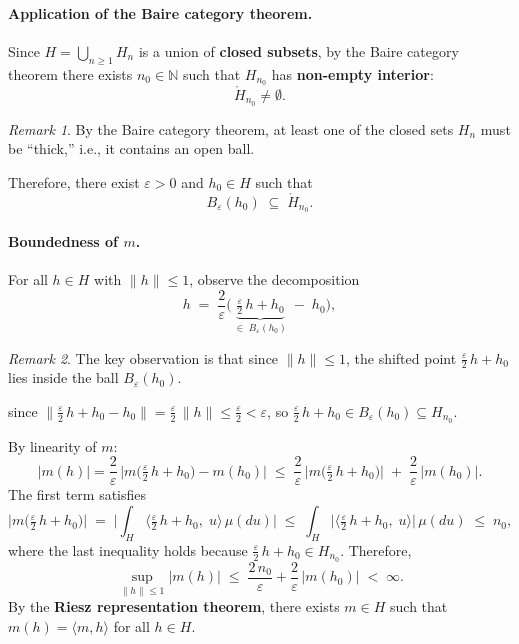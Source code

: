 \documentclass[11pt]{article}
\theoremstyle{definition}
\theoremstyle{remark}
\newtheorem{remark}{Remark}
\begin{document}
\paragraph{Application of the Baire category theorem.}
Since $H = \bigcup_{n \ge 1} H_n$ is a union of \textbf{closed subsets},
by the Baire category theorem there exists $n_0 \in \mathbb{N}$ such that
$H_{n_0}$ has \textbf{non-empty interior}:
\[
    \mathring{H}_{n_0} \neq \emptyset.
\]
\begin{remark}
By the Baire category theorem, at least one of the closed sets $H_n$ must be ``thick,'' i.e., it contains an open ball.
\end{remark}
Therefore, there exist $\varepsilon > 0$ and $h_0 \in H$ such that
\[
    B_\varepsilon(h_0) \;\subseteq\; \mathring{H}_{n_0}.
\]

\paragraph{Boundedness of $m$.}
For all $h \in H$ with $\|h\| \le 1$, observe the decomposition
\[
    h \;=\; \frac{2}{\varepsilon}
    \Big(\,\underbrace{\tfrac{\varepsilon}{2}\,h + h_0}_{\in\; B_\varepsilon(h_0)}
    \;-\; h_0\Big),
\]
\begin{remark}
The key observation is that since $\|h\| \le 1$, the shifted point $\tfrac{\varepsilon}{2}\,h + h_0$ lies inside the ball $B_\varepsilon(h_0)$.
\end{remark}
since
$\bigl\|\tfrac{\varepsilon}{2}\,h + h_0 - h_0\bigr\|
= \tfrac{\varepsilon}{2}\,\|h\| \le \tfrac{\varepsilon}{2} < \varepsilon$,
so $\tfrac{\varepsilon}{2}\,h + h_0 \in B_\varepsilon(h_0) \subseteq H_{n_0}$.

By linearity of $m$:
\[
    |m(h)|
    = \frac{2}{\varepsilon}\,
      \Big|m\!\Big(\tfrac{\varepsilon}{2}\,h + h_0\Big) - m(h_0)\Big|
    \;\le\;
    \frac{2}{\varepsilon}\,
      \Big|m\!\Big(\tfrac{\varepsilon}{2}\,h + h_0\Big)\Big|
    \;+\; \frac{2}{\varepsilon}\,|m(h_0)|.
\]
The first term satisfies
\[
    \Big|m\!\Big(\tfrac{\varepsilon}{2}\,h + h_0\Big)\Big|
    \;=\; \bigg|\int_H
          \Big\langle \tfrac{\varepsilon}{2}\,h + h_0,\; u \Big\rangle
          \,\mu(du)\bigg|
    \;\le\; \int_H
          \Big|\Big\langle \tfrac{\varepsilon}{2}\,h + h_0,\; u
          \Big\rangle\Big|\,\mu(du)
    \;\le\; n_0,
\]
where the last inequality holds because
$\tfrac{\varepsilon}{2}\,h + h_0 \in H_{n_0}$.
Therefore,
\[
    \sup_{\|h\| \le 1} |m(h)|
    \;\le\; \frac{2\,n_0}{\varepsilon} + \frac{2}{\varepsilon}\,|m(h_0)|
    \;<\; \infty.
\]
By the \textbf{Riesz representation theorem}, there exists $m \in H$ such that
$m(h) = \langle m, h \rangle$ for all $h \in H$.
\end{document}
